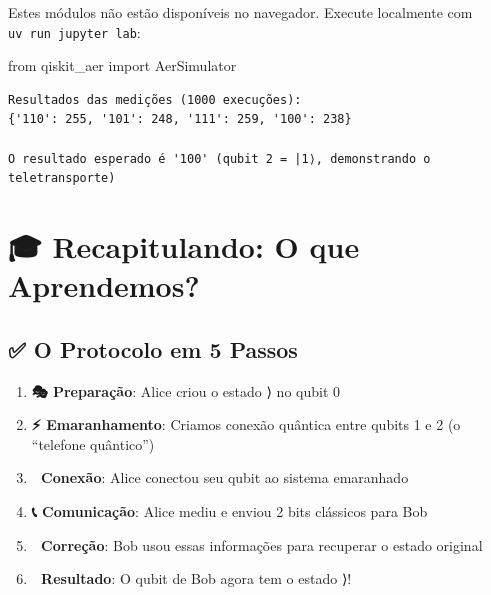 \documentclass[
  brazilian,
]{report}
\newenvironment{Shaded}{\begin{snugshade}}{\end{snugshade}}
\newcommand{\ImportTok}[1]{\textcolor[rgb]{0.00,0.46,0.62}{#1}}
\newcommand{\NormalTok}[1]{\textcolor[rgb]{0.00,0.23,0.31}{#1}}
\providecommand{\tightlist}{%
  \setlength{\itemsep}{0pt}\setlength{\parskip}{0pt}}
\begin{document}
\begin{tcolorbox}[enhanced jigsaw, arc=.35mm, bottomrule=.15mm, bottomtitle=1mm, breakable, colback=white, colbacktitle=quarto-callout-note-color!10!white, colframe=quarto-callout-note-color-frame, coltitle=black, left=2mm, leftrule=.75mm, opacityback=0, opacitybacktitle=0.6, rightrule=.15mm, title=\textcolor{quarto-callout-note-color}{\faInfo}\hspace{0.5em}{🔒 Imports do Qiskit (requerem execução local)}, titlerule=0mm, toprule=.15mm, toptitle=1mm]

Estes módulos não estão disponíveis no navegador. Execute localmente com
\texttt{uv\ run\ jupyter\ lab}:

\begin{Shaded}
\begin{Highlighting}[]
\ImportTok{from}\NormalTok{ qiskit\_aer }\ImportTok{import}\NormalTok{ AerSimulator}
\end{Highlighting}
\end{Shaded}

\end{tcolorbox}

\begin{verbatim}
Resultados das medições (1000 execuções):
{'110': 255, '101': 248, '111': 259, '100': 238}

O resultado esperado é '100' (qubit 2 = |1⟩, demonstrando o teletransporte)
\end{verbatim}

\chapter{🎓 Recapitulando: O que
Aprendemos?}\label{recapitulando-o-que-aprendemos}

\section{✅ O Protocolo em 5 Passos}\label{o-protocolo-em-5-passos}

\begin{enumerate}
\def\labelenumi{\arabic{enumi}.}
\tightlist
\item
  \textbf{🎭 Preparação}: Alice criou o estado ⟩ no qubit 0
\item
  \textbf{⚡ Emaranhamento}: Criamos conexão quântica entre qubits 1 e 2
  (o ``telefone quântico'')
\item
  \textbf{🔗 Conexão}: Alice conectou seu qubit ao sistema emaranhado
\item
  \textbf{📞 Comunicação}: Alice mediu e enviou 2 bits clássicos para
  Bob
\item
  \textbf{🔧 Correção}: Bob usou essas informações para recuperar o
  estado original
\item
  \textbf{🎉 Resultado}: O qubit de Bob agora tem o estado ⟩!
\end{enumerate}
\end{document}
